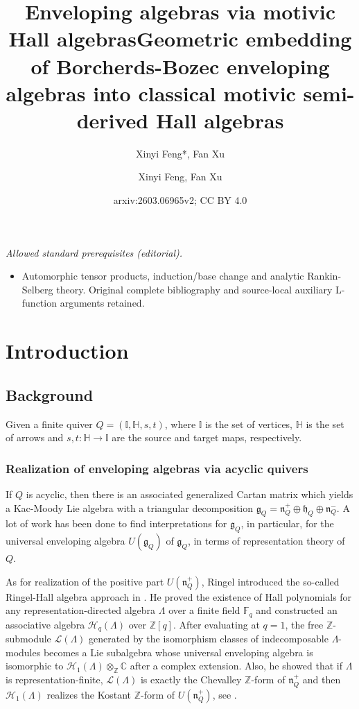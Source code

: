 \documentclass[12pt]{amsart}
\title{Enveloping algebras via motivic Hall algebras}
\author{Xinyi Feng*, Fan Xu}
\title{Geometric embedding of Borcherds-Bozec enveloping algebras into classical motivic semi-derived Hall algebras}
\author{Xinyi Feng, Fan Xu}
\date{arxiv:2603.06965v2; CC BY 4.0}
\theoremstyle{definition}
\numberwithin{equation}{section}
\begin{document}
\maketitle
\noindent\textit{Allowed standard prerequisites (editorial).}\begin{itemize}
\item Automorphic tensor products, induction/base change and analytic Rankin-Selberg theory. Original complete bibliography and source-local auxiliary L-function arguments retained.
\end{itemize}\medskip
\section{Introduction}

\subsection{Background}\;

Given a finite quiver $ Q=(\mathbb{I},\mathbb{H},s,t) $, where $ \mathbb{I} $ is the set of vertices, $ \mathbb{H} $ is the set of arrows and $ s,t:\mathbb{H} \to \mathbb{I} $ are the source and target maps, respectively. 

\subsubsection{Realization of enveloping algebras via acyclic quivers}\;

If $ Q $ is acyclic, then there is an associated generalized Cartan matrix which yields a Kac-Moody Lie algebra with a triangular decomposition $ \mathcal{\mathfrak{g}}_Q = \mathfrak{n}_Q^+ \oplus \mathfrak{h}_Q \oplus \mathfrak{n}_Q^- $.  
A lot of work has been done to find interpretations for $ \mathfrak{g}_Q $, in particular, for the universal enveloping algebra $ U(\mathfrak{g}_Q)  $ of $ \mathfrak{g}_Q $, in terms of representation theory of $ Q $. 

As for realization of the positive part $ U(\mathfrak{n}_Q^+) $, Ringel introduced the so-called Ringel-Hall algebra approach in \cite{R3,R5}. 
He proved the existence of Hall polynomials for any representation-directed algebra $ \Lambda $ over a finite field $ \mathbb{F}_q $ and constructed an associative algebra  $ \mathcal{H}_q(\Lambda) $ over $ \mathbb{Z}[q] $. 
After evaluating at $ q=1 $, the free $ \mathbb{Z} $-submodule $ \mathcal{L}(\Lambda) $ generated by the isomorphism classes of indecomposable $ \Lambda $-modules becomes a Lie subalgebra whose universal enveloping algebra is isomorphic to $ \mathcal{H}_1(\Lambda) \otimes_{\mathbb{Z}} \mathbb{C} $ after a complex extension.      
Also, he showed that if $ \Lambda $ is representation-finite, $ \mathcal{L}(\Lambda) $ is exactly the Chevalley $\mathbb{Z}$-form of $ \mathfrak{n}^+_Q $ and then $ \mathcal{H}_1(\Lambda) $ realizes the Kostant $ \mathbb{Z} $-form of $ U(\mathfrak{n}^+_Q) $, see \cite{R4}. 
\end{document}
